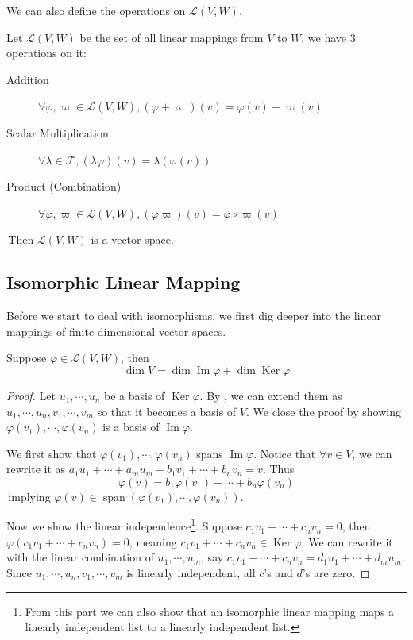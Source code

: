 We can also define the operations on $\mathcal{L}(V,W)$.
\begin{definition}
    Let $\mathcal{L}(V,W)$ be the set of all linear mappings from $V$ to $W$, we have 3 operations on it:
    \begin{description}
        \item[Addition] $\forall \varphi, \varpi \in \mathcal{L}(V,W), (\varphi+ \varpi)(v) = \varphi(v) + \varpi(v)$
        \item[Scalar Multiplication] $\forall \lambda \in \mathcal{F}, (\lambda \varphi)(v) = \lambda (\varphi(v))$
        \item[Product (Combination)]  $\forall \varphi, \varpi \in \mathcal{L}(V,W), (\varphi \varpi)(v) = \varphi\circ \varpi(v)$
    \end{description}
    \,Then $\mathcal{L}(V,W)$ is a vector space.
\end{definition}

\subsection{Isomorphic Linear Mapping}
Before we start to deal with isomorphisms, we first dig deeper into the linear mappings of finite-dimensional vector spaces.
\begin{theorem} 
    Suppose $\varphi \in \mathcal{L}(V,W)$, then $$\dim V = \dim \operatorname{Im}\varphi + \dim \operatorname{Ker} \varphi$$
\end{theorem}
\begin{proof}
    Let $u_1,\cdots,u_n$ be a basis of $\operatorname{Ker} \varphi$. By , we can extend them as $u_1,\cdots,u_n, v_1,\cdots, v_m$ so that
    it becomes a basis of $V$. We close the proof by showing $\varphi(v_1) ,\cdots,\varphi(v_n)$ is a basis of $\operatorname{Im}\varphi$.

    We first show that $\varphi(v_1) ,\cdots,\varphi(v_n)$ spans $\operatorname{Im} \varphi$. Notice that $\forall v \in V$, we can rewrite it as $a_1 u_1+\cdots+a_m u_m +b_1 v_1 +\cdots + b_n v_n = v$. Thus
    $$\varphi(v) = b_1 \varphi(v_1) +\cdots +b_n \varphi(v_n)$$
    \,implying $\varphi(v) \in \operatorname{span}(\varphi(v_1) ,\cdots,\varphi(v_n)).$

    Now we show the linear independence\footnote{From this part we can also show that an isomorphic linear mapping maps a linearly independent list to a linearly independent list.}. Suppose $c_1 v_1+\cdots+c_nv_n=0$, then $\varphi(c_1 v_1+\cdots+c_nv_n)=0$, meaning $c_1 v_1+\cdots+c_nv_n \in \operatorname{Ker} \varphi.$
    We can rewrite it with the linear combination of $u_1,\cdots,u_m$, say $c_1 v_1+\cdots+c_nv_n = d_1 u_1 +\cdots +d_m u_m$. Since $u_1,\cdots,u_n, v_1,\cdots, v_m$ is linearly independent, all $c$'s and $d$'s are zero.
\end{proof}

